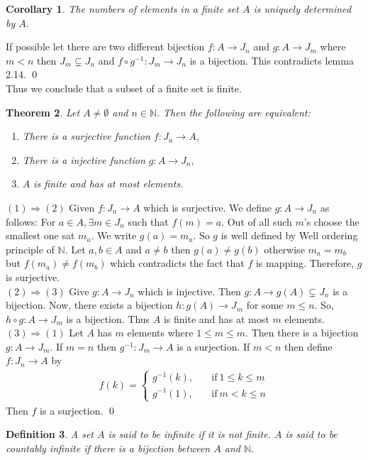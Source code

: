 \documentclass[11pt]{amsart}
\newtheorem{theorem}{Theorem}[section]
\newtheorem{definition}[theorem]{Definition}%
\newtheorem{corollary}[theorem]{Corollary}%
\newcommand{\NN}{\mathbb N}
\begin{document}
\begin{corollary}
The numbers of elements in a finite set $A$ is uniquely determined by $A.$
\end{corollary}
\proof If possible let there are two different bijection $f:A\to J_n$ and $g:A\to J_m$ where $m<n$ then $J_m\subsetneq J_n$ and $f\circ g^{-1}:J_m\to J_n$ is a bijection. This contradicts lemma 2.14. \qed\\
Thus we conclude that a subset of a finite set is finite.
\begin{theorem}
Let $A\neq \emptyset$ and $n\in {\NN}.$ Then the following are equivalent:
\begin{enumerate}
\item There is a surjective function $f:J_n\to A$,
\item There is a injective function $g:A\to J_n,$
\item $A$ is finite and has at most elements.
\end{enumerate}
\end{theorem}
\proof $(1)\Rightarrow (2)$ Given $f:J_n\to A$ which is surjective. We define $g:A\to J_n$ as follows: For $a\in A,\exists m\in J_n$ such that $f(m)=a.$ Out of all such $m$'s choose the smallest one sat $m_a.$ We write $g(a)=m_a.$ So $g$ is well defined by Well ordering principle of ${\NN}.$ Let $a,b\in A$ and $a\neq b$ then $g(a)\neq g(b)$ otherwise $m_a=m_b$ but $f(m_a)\neq f(m_b)$ which contradicts the fact that $f$ is mapping. Therefore, $g$ is surjective.\\
$(2)\Rightarrow (3)$ Give $g:A\to J_n$ which is injective. Then $g:A\to g(A)\subsetneq J_n$ is a bijection. Now, there exists a bijection $h:g(A)\to J_m$ for some $m\leq n.$ So, $h\circ g:A\to J_m$ is a bijection. Thus $A$ is finite and has at most $m$ elements.\\
$(3)\Rightarrow (1)$ Let $A$ has $m$ elements where $1\leq m\leq m.$ Then there is a bijection $g:A\to J_m.$ If $m=n$ then $g^{-1}:J_m\to A$ is a surjection. If $m<n$ then define $f:J_n\to A$ by \begin{align*}
f(k)=\begin{cases}
g^{-1}(k),\quad &\text{if}~1\leq k\leq m\\
g^{-1}(1),\quad &\text{if}~m<k\leq n
\end{cases}
\end{align*}
Then $f$ is a surjection. \qed
\begin{definition}
A set $A$ is said to be infinite if it is not finite. $A$ is said to be countably infinite if there is a bijection between $A$ and ${\NN}.$
\end{definition}
\end{document}
